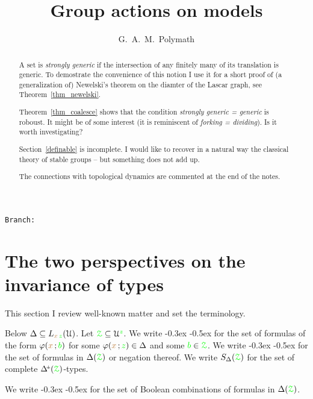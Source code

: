 \documentclass[10pt,openany]{amsproc}
\def\pmDelta{\smash{\Delta\hskip-.4ex\raisebox{.8ex}{$\scriptscriptstyle\pm$}}}
\def\BDelta{\smash{\Delta\hskip-.4ex\raisebox{.8ex}{\tiny\sf B}}}
\def\Z{\EuScript Z}
\def\U{\EuScript U}
\def\phi{\varphi}
\newcounter{thm}
\theoremstyle{mio}
\def\mr{\color{brown}}
\def\gr{\color{green}}
\def\grZ{{\gr\Z}}
\renewcommand*{\emph}[1]{%
\kern-0.3ex
\smash{\tikz[baseline]\node[rectangle, fill=black!20!yellow!50!white, rounded corners, inner xsep=0.5ex, inner ysep=0.2ex, anchor=base, minimum height = 2.7ex]{#1};}\kern-0.5ex
}
\newcommand\branch{}
\begin{document}
\author{G.\ A.\ M.\ Polymath}
\title{Group actions on models}
\hfill\texttt{Branch:\ \branch\ \DTMnow}
\maketitle
\raggedbottom
\begin{abstract}
  \setlength{\parindent}{0ex}
  \setlength{\parskip}{.4\baselineskip}
  A set is \textit{strongly generic\/} if the intersection of any finitely many of its translation is generic.
  To demostrate the convenience of this notion I use it for a short proof of (a generalization of) Newelski's theorem on the diamter of the Lascar graph, see Theorem~\ref{thm_newelski}.

  Theorem~\ref{thm_coalesce} shows that the condition \textit{strongly generic = generic\/} is roboust.
  It might be of some interest (it is reminiscent of \textit{forking = dividing\/}).
  Is it worth investigating?

  Section~\ref{definable} is incomplete.
  I would like to recover in a natural way the classical theory of stable groups -- but something does not add up.
  
  The connections with topological dynamics are commented at the end of the notes.
\end{abstract}

\def\medrel#1{\parbox[t]{5ex}{$\displaystyle\hfil #1$}}
\def\ceq#1#2#3{\parbox[t]{17ex}{$\displaystyle #1$}\medrel{#2}{$\displaystyle #3$}}

\section{The two perspectives on the invariance of types}

This section I review well-known matter and set the terminology.

Below $\Delta\subseteq L_{{\mr x}\,{\gr z}}(\U)$.
Let $\grZ\subseteq\U^{\gr z}$.
We write \emph{$\Delta(\grZ)$} for the set of formulas of the form $\phi({\mr x}\,;{\gr b})$ for some $\phi({\mr x}\,;{\gr z})\in\Delta$ and some ${\gr b}\in\grZ$.
We write \emph{$\pmDelta(\grZ)$} for the set of formulas in $\Delta(\grZ)$ or negation thereof.
We write $S_\Delta(\grZ)$ for the set of complete $\pmDelta(\grZ)$-types.

We write \emph{$\BDelta(\grZ)$} for the set of Boolean combinations of formulas in $\Delta(\grZ)$.
\end{document}
